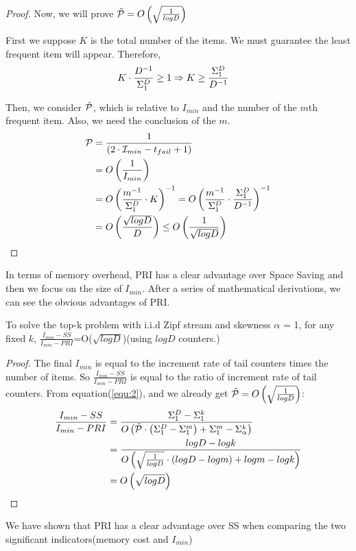 {\begin{proof}
Now, we will prove $\Tilde{\mathcal{P}}=O\left(\sqrt{\frac{1}{logD}}\right)$

First we suppose $K$ is the total number of the items. We must guarantee the least frequent item will appear. Therefore,
\begin{equation}
\begin{aligned}
\centering  
    K\cdot\frac{D^{-1}}{\Sigma_1^D}&\geq1 \Rightarrow K\geq\frac{\Sigma_1^D}{D^{-1}}  
\end{aligned}
\end{equation}

Then, we consider $\Tilde{\mathcal{P}}$, which is relative to $I_{min}$ and the number of the $m$th frequent item. Also, we need the conclusion of the $m$.
\begin{equation}
\begin{aligned}
\centering  
\mathcal{P}&=\frac{1}{(2\cdot\iii_{min}-t_{fail}+1)}\\
&=O\left(\frac{1}{I_{min}}\right)\\
&=O\left(\frac{m^{-1}}{\Sigma_1^D}\cdot K\right)^{-1}=O\left(\frac{m^{-1}}{\Sigma_1^D}\cdot \frac{\Sigma_1^D}{D^{-1}}\right)^{-1}\\
&=O\left(\frac{\sqrt{logD}}{D}\right)\leq O\left(\frac{1}{\sqrt{logD}}\right)
\end{aligned}
\end{equation}
\end{proof}

In terms of memory overhead, PRI has a clear advantage over Space Saving and then we focus on the size of $I_{min}$. After a series of mathematical derivations, we can see the obvious advantages of PRI.

\begin{theorem}
	To solve the top-k problem with i.i.d Zipf stream and skewness $\alpha$ = 1, for any fixed $k$, $\frac{I_{min}-SS}{I_{min}-PRI}$=O($\sqrt{logD}$)(using $logD$ counters.) 
\end{theorem}


\begin{proof}
The final $I_{min}$ is equal to the increment rate of tail counters times the number of items. So $\frac{I_{min}-SS}{I_{min}-PRI}$ is equal to the ratio of increment rate of tail counters. From equation(\ref{equ:2}), and we already get $\Tilde{\mathcal{P}}=O\left(\sqrt{\frac{1}{logD}}\right)$:
\begin{equation}
\begin{aligned}
\centering  
\frac{I_{min}-SS}{I_{min}-PRI} &=\frac{\Sigma_1^D-\Sigma_1^k}{O\left(\Tilde{\mathcal{P}}\cdot\left(\Sigma_1^D-\Sigma_1^m\right)+\Sigma_1^m-\Sigma_\alpha^k\right)}\\
&=\frac{logD-logk}{O\left(\sqrt{\frac{1}{logD}}\cdot\left(logD-logm\right)+logm-logk\right)}\\
&=O\left(\sqrt{logD}\right)
\end{aligned}
\end{equation}

\end{proof}
We have shown that PRI has a clear advantage over SS when comparing the two significant indicators(memory cost and $I_{min}$)
}